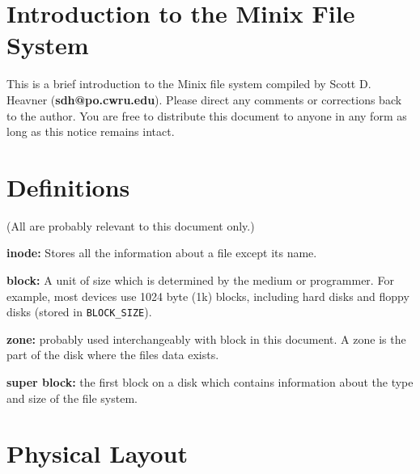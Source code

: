 
% 
%
%
\parindent 0pt
\parskip 5pt
\topmargin 0pt
\textheight 9in
\textwidth 6.5in
\oddsidemargin 0pt
\evensidemargin 0pt
\pagestyle{myheadings}



\section*{Introduction to the Minix File System}

This is a brief introduction to the Minix file system compiled by
Scott D. Heavner \linebreak[4]
({\bf sdh@po.cwru.edu}).  Please direct any comments or
corrections back to the author.  You are free to distribute this
document to anyone in any form as long as this notice remains intact.

\section{Definitions}

(All are probably relevant to this document only.)

{\bf inode:} Stores all the information about a file except its
name.

{\bf block:} A unit of size which is determined by the medium or
programmer.  For example, most devices use 1024 byte (1k) blocks,
including hard disks and floppy disks (stored in {\tt BLOCK\_SIZE}).

{\bf zone:} probably used interchangeably with block in this document.
A zone is the part of the disk where the files data exists.

{\bf super block:} the first block on a disk which contains
information about the type and size of the file system.

\section{Physical Layout}

